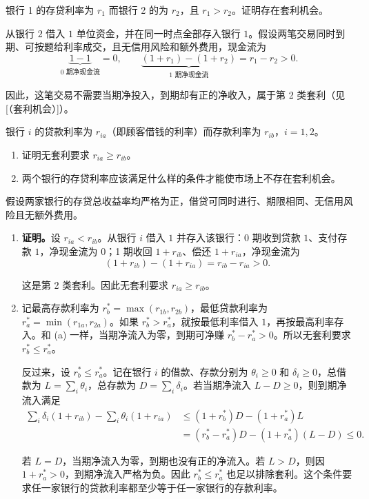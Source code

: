 \begin{problem}
 银行 1 的存贷利率为 $r_{1}$ 而银行 2 的为 $r_{2}$，且 $r_{1}>r_{2}$。证明存在套利机会。
\end{problem}
\begin{solution}[label-content={证明},blank-type=manual,blank-vsep=9\baselineskip]
从银行 $2$ 借入 $1$ 单位资金，并在同一时点全部存入银行 $1$。假设两笔交易同时到期、可按题给利率成交，且无信用风险和额外费用，现金流为
\[
 \underbrace{1-1}_{\text{0 期净现金流}}=0,\qquad
 \underbrace{(1+r_1)-(1+r_2)}_{\text{1 期净现金流}}=r_1-r_2>0.
\]

因此，这笔交易不需要当期净投入，到期却有正的净收入，属于第 2 类套利\ifdefined\WJHandoutKnowledge（见[（套利机会）]）\fi。
\end{solution}

\begin{problem}
 银行 $i$ 的贷款利率为 $r_{ia}$（即顾客借钱的利率）而存款利率为 $r_{ib}$，$i=1,2$。
\begin{enumerate}[label=(\alph*)]
    \item 证明无套利要求 $r_{ia}\ge r_{ib}$。
    \item 两个银行的存贷利率应该满足什么样的条件才能使市场上不存在套利机会。
\end{enumerate}
\end{problem}
\begin{solution}[blank-type=manual,blank-vsep=9\baselineskip]
假设两家银行的存贷总收益率均严格为正，借贷可同时进行、期限相同、无信用风险且无额外费用。

\begin{enumerate}[label=(\alph*)]
    \item \textbf{证明。}设 $r_{ia}<r_{ib}$。从银行 $i$ 借入 $1$ 并存入该银行：0 期收到贷款 $1$、支付存款 $1$，净现金流为 $0$；1 期收回 $1+r_{ib}$、偿还 $1+r_{ia}$，净现金流为
    \[
        (1+r_{ib})-(1+r_{ia})=r_{ib}-r_{ia}>0.
    \]

    这是第 2 类套利。因此无套利要求 $r_{ia}\ge r_{ib}$。
    \item 记最高存款利率为 $r_b^*=\max(r_{1b},r_{2b})$，最低贷款利率为 $r_a^*=\min(r_{1a},r_{2a})$。如果 $r_b^*>r_a^*$，就按最低利率借入 $1$，再按最高利率存入。和 (a) 一样，当期净流入为零，到期可净赚 $r_b^*-r_a^*>0$。所以无套利要求 $r_b^*\le r_a^*$。

    反过来，设 $r_b^*\le r_a^*$。记在银行 $i$ 的借款、存款分别为 $\theta_i\ge0$ 和 $\delta_i\ge0$，总借款为 $L=\sum_i\theta_i$，总存款为 $D=\sum_i\delta_i$。若当期净流入 $L-D\ge0$，则到期净流入满足
    \[
      \begin{aligned}
        \sum_i\delta_i(1+r_{ib})-\sum_i\theta_i(1+r_{ia})
        &\le (1+r_b^*)D-(1+r_a^*)L\\
        &=(r_b^*-r_a^*)D-(1+r_a^*)(L-D)\le0.
      \end{aligned}
    \]

    若 $L=D$，当期净流入为零，到期也没有正的净流入。若 $L>D$，则因 $1+r_a^*>0$，到期净流入严格为负。因此 $r_b^*\le r_a^*$ 也足以排除套利。这个条件要求任一家银行的贷款利率都至少等于任一家银行的存款利率。
\end{enumerate}
\end{solution}

